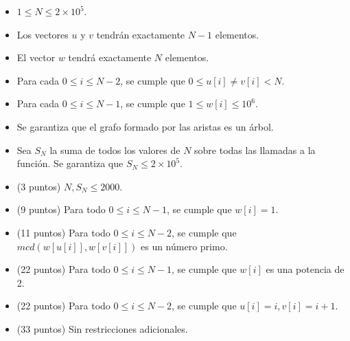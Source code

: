 \documentclass[12pt]{scrartcl}
\begin{document}
        \begin{itemize}
            \item $1 \le N \le 2\times10^5$.
            \item Los vectores $u$ y $v$ tendrán exactamente $N - 1$ elementos.
            \item El vector $w$ tendrá exactamente $N$ elementos.
            \item Para cada $0 \le i \le N - 2$, se cumple que $0 \le u[i] \neq v[i] < N$. 
            \item Para cada $0 \le i \le N - 1$, se cumple que $1 \le w[i] \le 10^6$.
            \item Se garantiza que el grafo formado por las aristas es un árbol.
            \item Sea $S_N$ la suma de todos los valores de $N$ sobre todas las llamadas a la función. Se garantiza que $S_N \le 2\times 10^5$.
        \end{itemize}
    


    \begin{itemize}
        \item (3 puntos) $N, S_N \le 2000$.
        \item (9 puntos) Para todo $0 \le i \le N - 1$, se cumple que $w[i] = 1$.
        \item (11 puntos) Para todo $0 \le i \le N - 2$, se cumple que $mcd(w[u[i]], w[v[i]])$ es un número primo.
        \item (22 puntos) Para todo $0 \le i \le N - 1$, se cumple que $w[i]$ es una potencia de 2.
        \item (22 puntos) Para todo $0 \le i \le N - 2$, se cumple que $u[i] = i, v[i] = i + 1$.
        \item (33 puntos) Sin restricciones adicionales.
    \end{itemize}
\end{document}
